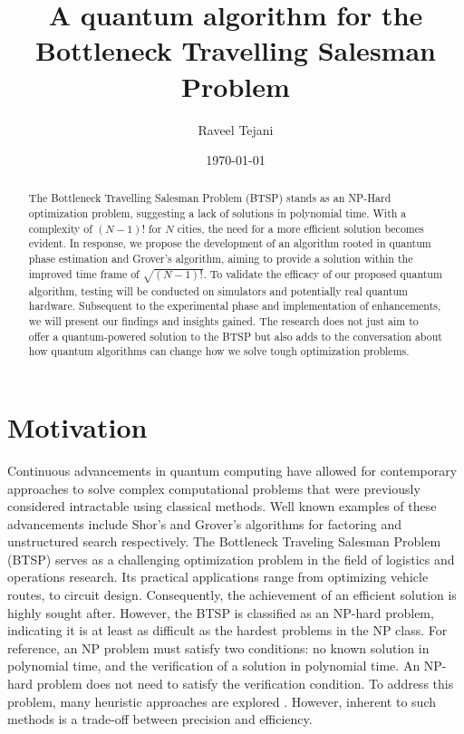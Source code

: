 \documentclass[twocolumn,showpacs,preprintnumbers,amsmath,amssymb]{revtex4}
\begin{document}
		
		\title{A quantum algorithm for the Bottleneck Travelling Salesman Problem}
		
		\author{Raveel Tejani}
		
		\date{\today}
		
		\begin{abstract}			
			The Bottleneck Travelling Salesman Problem (BTSP) stands as an NP-Hard optimization problem, suggesting a lack of solutions in polynomial time. With a complexity of $(N-1)!$ for $N$ cities, the need for a more efficient solution becomes evident. In response, we propose the development of an algorithm rooted in quantum phase estimation and Grover's algorithm, aiming to provide a solution within the improved time frame of $\sqrt{(N-1)!}$. To validate the efficacy of our proposed quantum algorithm, testing will be conducted on simulators and potentially real quantum hardware. Subsequent to the experimental phase and implementation of enhancements, we will present our findings and insights gained. The research does not just aim to offer a quantum-powered solution to the BTSP but also adds to the conversation about how quantum algorithms can change how we solve tough optimization problems.
		\end{abstract}
		
		\maketitle
		
		
		\section{Motivation}
		
		
		Continuous advancements in quantum computing have allowed for contemporary approaches to solve complex computational problems that were previously considered intractable using classical methods. Well known examples of these advancements include Shor's \cite{Shor} and Grover's \cite{grover1996fast} algorithms for factoring and unstructured search respectively. The Bottleneck Traveling Salesman Problem (BTSP) serves as a challenging optimization problem in the field of logistics and operations research. Its practical applications range from optimizing vehicle routes, to circuit design. Consequently, the achievement of an efficient solution is highly sought after. However, the BTSP is classified as an NP-hard problem, indicating it is at least as difficult as the hardest problems in the NP class. For reference, an NP problem must satisfy two conditions: no known solution in polynomial time, and the verification of a solution in polynomial time. An NP-hard problem does not need to satisfy the verification condition. To address this problem, many heuristic approaches are explored \cite{heuristicthesis}\cite{heuristic}. However, inherent to such methods is a trade-off between precision and efficiency.
		
\end{document}

